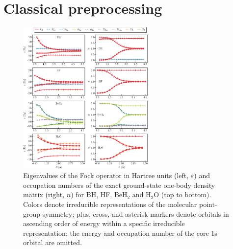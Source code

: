 \documentclass[aps,pra,onecolumn]{revtex4-2}
\begin{document}
\section{Classical preprocessing}
\label{sec:classical}

\begin{figure}[t!]
\includegraphics[width=0.6\textwidth]{../figures/scf_fci/scf_fci.eps}
\caption{Eigenvalues of the Fock operator in Hartree units (left, $\varepsilon$) and occupation numbers of the exact ground-state one-body density matrix (right, $n$) 
for BH, HF, BeH$_2$ and H$_2$O (top to bottom). 
Colors denote irreducible representations of the molecular point-group symmetry;
plus, cross, and asterisk markers denote orbitals in ascending order of energy within a specific irreducible representation;
the energy and occupation number of the core 1s orbital are omitted.}
\label{figure:scf}
\end{figure}



\end{document}
